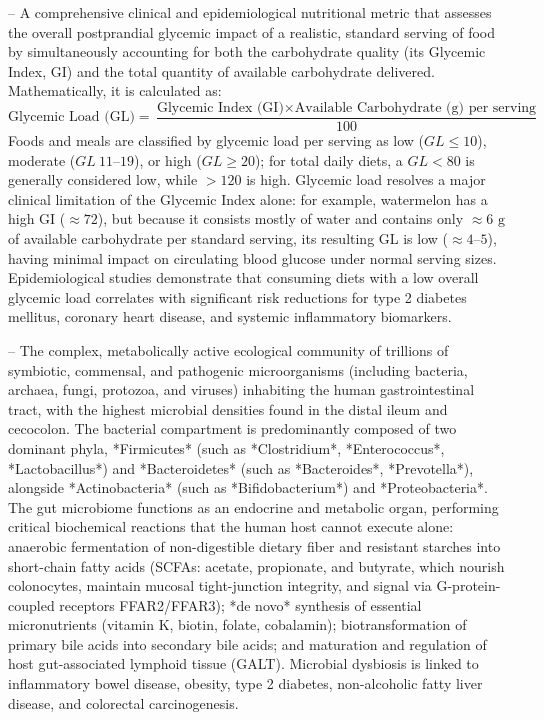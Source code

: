 -- A comprehensive clinical and epidemiological nutritional metric that assesses the overall postprandial glycemic impact of a realistic, standard serving of food by simultaneously accounting for both the carbohydrate quality (its Glycemic Index, GI) and the total quantity of available carbohydrate delivered. Mathematically, it is calculated as: \[\text{Glycemic Load (GL)} = \frac{\text{Glycemic Index (GI)} \times \text{Available Carbohydrate (g) per serving}}{100}\]Foods and meals are classified by glycemic load per serving as low ($GL \le 10$), moderate ($GL\ 11\text{--}19$), or high ($GL \ge 20$); for total daily diets, a $GL < 80$ is generally considered low, while $>120$ is high. Glycemic load resolves a major clinical limitation of the Glycemic Index alone: for example, watermelon has a high GI ($\approx 72$), but because it consists mostly of water and contains only $\approx 6\text{ g}$ of available carbohydrate per standard serving, its resulting GL is low ($\approx 4\text{--}5$), having minimal impact on circulating blood glucose under normal serving sizes. Epidemiological studies demonstrate that consuming diets with a low overall glycemic load correlates with significant risk reductions for type 2 diabetes mellitus, coronary heart disease, and systemic inflammatory biomarkers.

-- The complex, metabolically active ecological community of trillions of symbiotic, commensal, and pathogenic microorganisms (including bacteria, archaea, fungi, protozoa, and viruses) inhabiting the human gastrointestinal tract, with the highest microbial densities found in the distal ileum and cecocolon. The bacterial compartment is predominantly composed of two dominant phyla, *Firmicutes* (such as *Clostridium*, *Enterococcus*, *Lactobacillus*) and *Bacteroidetes* (such as *Bacteroides*, *Prevotella*), alongside *Actinobacteria* (such as *Bifidobacterium*) and *Proteobacteria*. The gut microbiome functions as an endocrine and metabolic organ, performing critical biochemical reactions that the human host cannot execute alone: anaerobic fermentation of non-digestible dietary fiber and resistant starches into short-chain fatty acids (SCFAs: acetate, propionate, and butyrate, which nourish colonocytes, maintain mucosal tight-junction integrity, and signal via G-protein-coupled receptors FFAR2/FFAR3); *de novo* synthesis of essential micronutrients (vitamin K, biotin, folate, cobalamin); biotransformation of primary bile acids into secondary bile acids; and maturation and regulation of host gut-associated lymphoid tissue (GALT). Microbial dysbiosis is linked to inflammatory bowel disease, obesity, type 2 diabetes, non-alcoholic fatty liver disease, and colorectal carcinogenesis.

